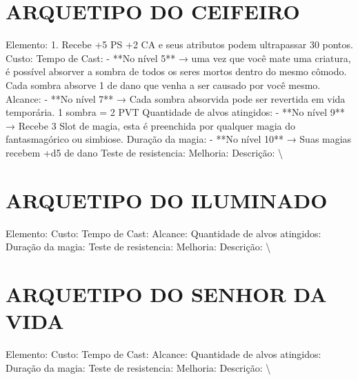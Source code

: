 \documentclass{article}%
\begin{document}
%
\section{ARQUETIPO DO CEIFEIRO}%
\label{sec:ARQUETIPODOCEIFEIRO}%
Elemento: 1. Recebe +5 PS +2 CA e seus atributos podem ultrapassar 30 pontos.\newline%
Custo: \newline%
Tempo de Cast: {-} **No nível 5** → uma vez que você mate uma criatura, é possível absorver a sombra de todos os seres mortos dentro do mesmo cômodo. Cada sombra absorve 1 de dano que venha a ser causado por você mesmo.\newline%
Alcance: {-} **No nível 7** → Cada sombra absorvida pode ser revertida em vida temporária. 1 sombra = 2 PVT\newline%
Quantidade de alvos atingidos: {-} **No nível 9** → Recebe 3 Slot de magia, esta é preenchida por qualquer magia do fantasmagórico ou simbiose.\newline%
Duração da magia: {-} **No nível 10** → Suas magias recebem +d5 de dano\newline%
Teste de resistencia: \newline%
Melhoria: \newline%
Descrição: \textbackslash{}

%
\section{ARQUETIPO DO ILUMINADO}%
\label{sec:ARQUETIPODOILUMINADO}%
Elemento: \newline%
Custo: \newline%
Tempo de Cast: \newline%
Alcance: \newline%
Quantidade de alvos atingidos: \newline%
Duração da magia: \newline%
Teste de resistencia: \newline%
Melhoria: \newline%
Descrição: \textbackslash{}

%
\section{ARQUETIPO DO SENHOR DA VIDA}%
\label{sec:ARQUETIPODOSENHORDAVIDA}%
Elemento: \newline%
Custo: \newline%
Tempo de Cast: \newline%
Alcance: \newline%
Quantidade de alvos atingidos: \newline%
Duração da magia: \newline%
Teste de resistencia: \newline%
Melhoria: \newline%
Descrição: \textbackslash{}
\end{document}

